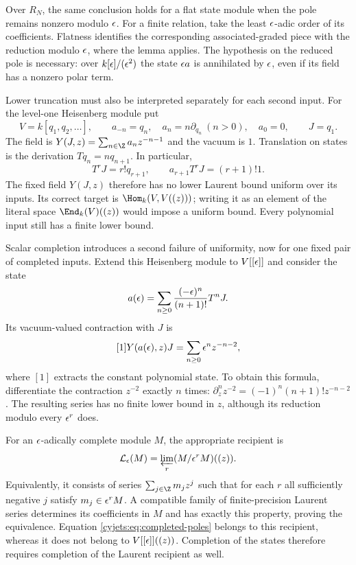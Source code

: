 Over $R_N$, the same conclusion holds for a flat state module when
the pole remains nonzero modulo $\epsilon$. For a finite relation, take
the least $\epsilon$-adic order of its coefficients. Flatness identifies
the corresponding associated-graded piece with the reduction modulo
$\epsilon$, where the lemma applies. The hypothesis on the reduced pole
is necessary: over $k[\epsilon]/(\epsilon^2)$ the state $\epsilon a$ is
annihilated by $\epsilon$, even if its field has a nonzero polar term.

Lower truncation must also be interpreted separately for each second
input. For the level-one Heisenberg module put
\[
 V=k[q_1,q_2,\ldots],\qquad
 a_{-n}=q_n,\quad a_n=n\partial_{q_n}\ (n>0),\quad a_0=0,
 \qquad J=q_1.
\]
The field is $Y(J,z)=\sum_{n\in\Z}a_nz^{-n-1}$ and the vacuum
is $1$. Translation on states is the derivation
$Tq_n=nq_{n+1}$. In particular,
\begin{equation}\label{cyjets:eq:unbounded-poles}
 T^rJ=r!q_{r+1},\qquad
 a_{r+1}T^rJ=(r+1)!1.
\end{equation}
The fixed field $Y(J,z)$ therefore has no lower Laurent bound
uniform over its inputs. Its correct target is
$\Hom_k(V,V((z)))$; writing it as an element of the literal space
$\End_k(V)((z))$ would impose a uniform bound. Every polynomial
input still has a finite lower bound.

Scalar completion introduces a second failure of uniformity, now
for one fixed pair of completed inputs. Extend this Heisenberg module
to $V[[\epsilon]]$ and consider the state
\[
 a(\epsilon)=\sum_{n\geq0}\frac{(-\epsilon)^n}{(n+1)!}T^nJ.
\]
Its vacuum-valued contraction with $J$ is
\begin{equation}\label{cyjets:eq:completed-poles}
 [1]Y(a(\epsilon),z)J=\sum_{n\geq0}\epsilon^n z^{-n-2},
\end{equation}
where $[1]$ extracts the constant polynomial state. To obtain this
formula, differentiate the contraction $z^{-2}$ exactly $n$ times:
$\partial_z^nz^{-2}=(-1)^n(n+1)!z^{-n-2}$.
The resulting series has no finite lower bound in $z$, although
its reduction modulo every $\epsilon^r$ does.

For an $\epsilon$-adically complete module $M$, the appropriate recipient is
\begin{equation}\label{cyjets:eq:restricted-laurent}
 \mathcal L_\epsilon(M)=\varprojlim_r(M/\epsilon^rM)((z)).
\end{equation}
Equivalently, it consists of series $\sum_{j\in\Z}m_jz^j$ such
that for each $r$ all sufficiently negative $j$ satisfy
$m_j\in\epsilon^rM$. A compatible family of finite-precision Laurent
series determines its coefficients in $M$ and has exactly this
property, proving the equivalence. Equation
\eqref{cyjets:eq:completed-poles} belongs to this recipient, whereas
it does not belong to $V[[\epsilon]]((z))$. Completion of the states
therefore requires completion of the Laurent recipient as well.

